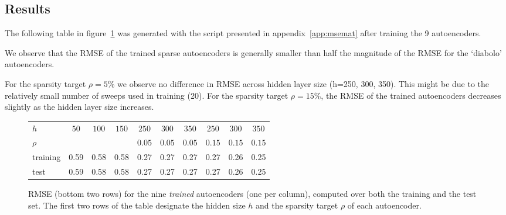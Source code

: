 \documentclass{article}
\begin{document}
\subsection{Results}
The following table {\color{blue}in figure~\ref{fig:rmse_global}} was generated with the script presented in appendix~\ref{app:msemat} after training the 9 autoencoders. {\color{blue}We observe that the RMSE of the trained sparse autoencoders is generally smaller than half the magnitude of the RMSE for the `diabolo' autoencoders. 

For the sparsity target $\rho=5$\% we observe no difference in RMSE across hidden layer size (h=250, 300, 350). This might be due to the relatively small number of sweeps used in training (20). 
For the sparsity target $\rho=15$\%, the RMSE of the trained autoencoders decreases slightly as the hidden layer size increases.}
\begin{figure}[bth!]
\centering
{\color{blue}
\begin{tabular}{|l | c  cc|ccc|ccc|}
\hline
$h$& $50$&$100$&$150$&
$250$&$300$&$350$&
$250$&$300$&$350$\\ 
$\rho$& &&&
$ 0.05$&$0.05$&$ 0.05$&
$ 0.15$&$0.15$&$0.15$\\ 
\hline
training & 0.59   & 0.58  &  0.58  &  0.27    &0.27  &  0.27&    0.27 &   0.26   &0.25\\
                                    
test &  0.59&0.58&0.58&0.27&0.27&0.27&0.27&0.26&0.25\\
\hline
\end{tabular}}
\caption{{\color{blue}RMSE (bottom two rows) for the nine \emph{trained} autoencoders (one per column), computed over both the training and the test set. The first two rows of the table designate the hidden size $h$ and the sparsity target $\rho$ of each autoencoder.}}\label{fig:rmse_global}
\end{figure}
\end{document}
